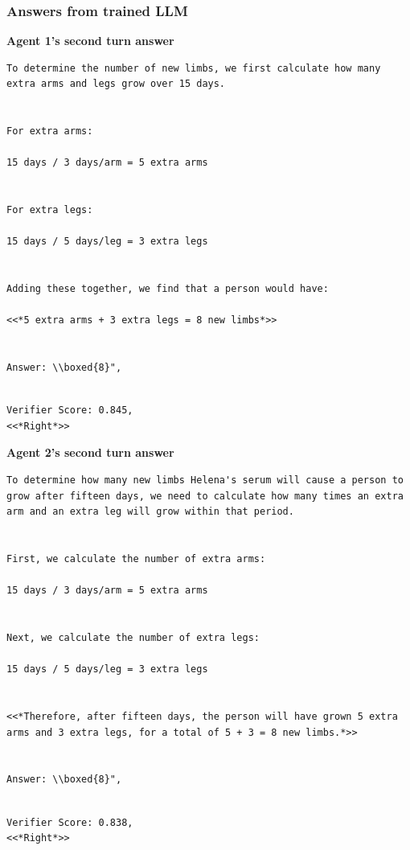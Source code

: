 \subsubsection{Answers from \oursspace trained LLM}
\textbf{Agent 1's second turn answer }
\begin{lstlisting}[breaklines=true]
To determine the number of new limbs, we first calculate how many extra arms and legs grow over 15 days.


For extra arms:

15 days / 3 days/arm = 5 extra arms


For extra legs:

15 days / 5 days/leg = 3 extra legs


Adding these together, we find that a person would have:

<<*5 extra arms + 3 extra legs = 8 new limbs*>>


Answer: \\boxed{8}",


\end{lstlisting}
\begin{lstlisting}
Verifier Score: 0.845,
<<*Right*>> 
\end{lstlisting}



\textbf{Agent 2's second turn answer }
\begin{lstlisting}[breaklines=true]
To determine how many new limbs Helena's serum will cause a person to grow after fifteen days, we need to calculate how many times an extra arm and an extra leg will grow within that period.


First, we calculate the number of extra arms:

15 days / 3 days/arm = 5 extra arms


Next, we calculate the number of extra legs:

15 days / 5 days/leg = 3 extra legs


<<*Therefore, after fifteen days, the person will have grown 5 extra arms and 3 extra legs, for a total of 5 + 3 = 8 new limbs.*>>


Answer: \\boxed{8}",


\end{lstlisting}
\begin{lstlisting}
Verifier Score: 0.838,
<<*Right*>> 
\end{lstlisting}


